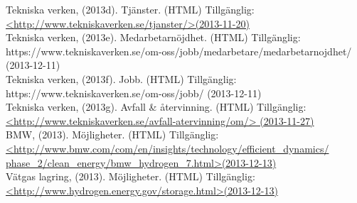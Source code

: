 \documentclass[10pt,a4paper]{article}
\begin{document}
Tekniska verken, (2013d). Tjänster. (HTML) Tillgänglig: \\
\hyperref{http://www.tekniskaverken.se/tjanster/}{}{}{<http://www.tekniskaverken.se/tjanster/>(2013-11-20)}\\

Tekniska verken, (2013e). Medarbetarnöjdhet. (HTML) Tillgänglig: \\
https://www.tekniskaverken.se/om-oss/jobb/medarbetare/medarbetarnojdhet/ (2013-12-11)\\

Tekniska verken, (2013f). Jobb. (HTML) Tillgänglig: \\
https://www.tekniskaverken.se/om-oss/jobb/ (2013-12-11)\\

Tekniska verken, (2013g). Avfall \& återvinning. (HTML) Tillgänglig: \\
\hyperref{http://www.tekniskaverken.se/avfall-atervinning/om/}{}{}{<http://www.tekniskaverken.se/avfall-atervinning/om/> (2013-11-27)} \\


BMW, (2013). Möjligheter. (HTML) Tillgänglig: \\
\hyperref{http://www.bmw.com/com/en/insights/technology/efficient_dynamics/phase_2/clean_energy/bmw_hydrogen_7.html}{}{}{<http://www.bmw.com/com/en/insights/technology/efficient\_dynamics/\\phase\_2/clean\_energy/bmw\_hydrogen\_7.html>(2013-12-13)}\\

Vätgas lagring, (2013). Möjligheter. (HTML) Tillgänglig: \\
\hyperref{http://www.hydrogen.energy.gov/storage.html}{}{}{<http://www.hydrogen.energy.gov/storage.html>(2013-12-13)}\\
\end{document}
